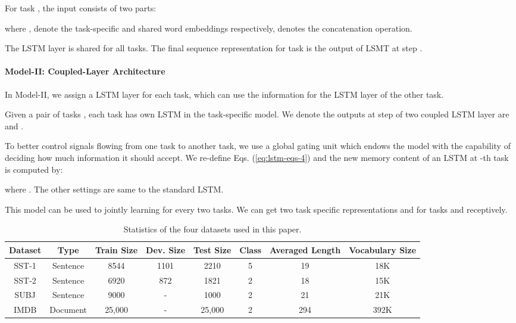 \documentclass{article}
\begin{document}
For task , the input  consists of two parts:

where  ,  denote the task-specific and shared word embeddings respectively,  denotes the concatenation operation.

The LSTM layer is shared for all tasks. The final sequence representation for task  is
the output of LSMT at step .
 





\paragraph{Model-II: Coupled-Layer Architecture}

In Model-II, we assign a LSTM layer for each task, which can use the information for the LSTM layer of the other task.

Given a pair of tasks , each task has own LSTM in the task-specific model. We denote the outputs at step  of two coupled LSTM layer are  and .

To better control signals flowing from one task to another task, we use a global gating unit which endows the model with the capability of deciding how much information it should accept. We re-define Eqs. (\ref{eq:lstm-eqs-4}) and the new memory content of an LSTM at -th task is computed by:

where . The other settings are same to the standard LSTM.

This model can be used to jointly learning for every two tasks. We can get two task specific representations  and  for tasks  and  receptively.



\begin{table*}[!th]\centering
  \begin{tabular}{|*{8}{c|}}
    \hline
Dataset & Type & Train Size & Dev. Size& Test Size & Class & Averaged Length & Vocabulary Size  \\
    \hline
    SST-1 & Sentence & 8544 & 1101 & 2210 & 5 & 19 & 18K\\
    SST-2 & Sentence & 6920 & 872 & 1821 & 2 & 18 & 15K\\

    SUBJ & Sentence & 9000 & - & 1000 & 2 & 21 & 21K\\
    IMDB & Document & 25,000 & - & 25,000 & 2 & 294 & 392K\\
    \hline
  \end{tabular}
  \caption{Statistics of the four datasets used in this paper.}\label{tab:data}
\end{table*}
\end{document}
